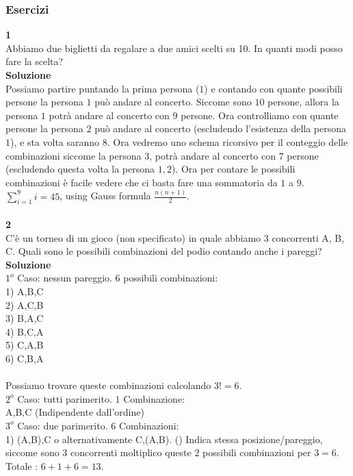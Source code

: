\documentclass[11pt]{article}
\begin{document}
        \subsubsection{Esercizi}
            \textbf{\large 1}\\
            Abbiamo due biglietti da regalare a due amici scelti su 10. In quanti modi posso fare la scelta?
            \\
            \textbf{\large Soluzione}\\
            Possiamo partire puntando la prima persona ($1$) e contando con quante possibili persone la persona $1$ può andare al concerto. Siccome sono $10$ persone, allora la persona $1$ potrà andare al concerto con $9$ persone.
            Ora controlliamo con quante persone la persona $2$ può andare al concerto (escludendo l'esistenza della persona $1$), e sta volta saranno $8$.
            Ora vedremo uno schema ricorsivo per il conteggio delle combinazioni siccome la persona $3$, potrà andare al concerto con $7$ persone (escludendo questa volta la persona $1, 2$).
            Ora per contare le possibili combinazioni \`e facile vedere che ci basta fare una sommatoria da $1$ a $9$.
            \\    
            $\sum_{i=1}^{9}i = 45$, using Gauss formula $\frac{n(n+1)}{2}$.
            \\
            \\
            \textbf{\large 2}\\
            C'è un torneo di un gioco (non specificato) in quale abbiamo 3 concorrenti A, B, C. Quali sono le possibili combinazioni del podio contando anche i pareggi?
            \\
            \textbf{\large Soluzione}\\
            $1^o$ Caso: nessun pareggio. 6 possibili combinazioni:\\
            1) A,B,C\\
            2) A,C,B\\
            3) B,A,C\\
            4) B,C,A\\
            5) C,A,B\\
            6) C,B,A\\
            \\
            Possiamo trovare queste combinazioni calcolando $3! = 6$.\\
            $2^o$ Caso: tutti parimerito. $1$ Combinazione:\\
            A,B,C (Indipendente dall'ordine)\\
            $3^o$ Caso: due parimerito. $6$ Combinazioni:\\
            1) (A,B),C o alternativamente C,(A,B). () Indica stessa posizione/pareggio, siccome sono $3$ concorrenti moltiplico queste $2$ possibili combinazioni per $3 = 6$.\\
            Totale : $6 + 1 + 6 = 13$.
                
\end{document}

